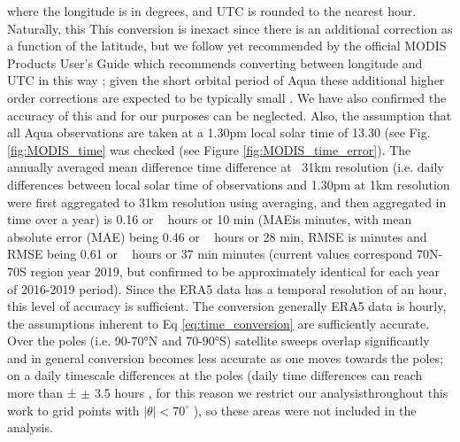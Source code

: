 \documentclass[hess, twostagejnl]{copernicus}
\providecommand{\DIFadd}[1]{{\protect\color{blue} \sf #1}} %
\providecommand{\DIFdel}[1]{{\protect\color{red} \scriptsize #1}} %
\providecommand{\DIFaddbegin}{} %
\providecommand{\DIFaddend}{} %
\providecommand{\DIFdelbegin}{} %
\providecommand{\DIFdelend}{} %
\begin{document}
where \DIFdelbegin \DIFdel{the }\DIFdelend \DIFaddbegin \DIFadd{longitude is in degrees, and }\DIFaddend UTC is rounded to the nearest hour. \DIFdelbegin \DIFdel{Naturally, this }\DIFdelend \DIFaddbegin \DIFadd{This }\DIFaddend conversion is inexact since there is an additional correction as a function of the latitude, \DIFdelbegin \DIFdel{but we follow }\DIFdelend \DIFaddbegin \DIFadd{yet recommended by }\DIFaddend the official MODIS Products User’s Guide \DIFdelbegin \DIFdel{\cite{MODISusersguide} which recommends converting between longitude and UTC in this way}\DIFdelend \DIFaddbegin \DIFadd{\citep{MODISusersguide}}\DIFaddend ; given the short orbital period of Aqua these \DIFaddbegin \DIFadd{additional }\DIFaddend higher order corrections are expected to be typically small \DIFdelbegin \DIFdel{. We have also confirmed the accuracy of this }\DIFdelend \DIFaddbegin \DIFadd{and for our purposes can be neglected. Also, the }\DIFaddend assumption that all Aqua observations are taken at \DIFdelbegin \DIFdel{a }\DIFdelend \DIFaddbegin \DIFadd{1.30pm }\DIFaddend local solar time \DIFdelbegin \DIFdel{of 13.30 (see Fig. \ref{fig:MODIS_time}}\DIFdelend \DIFaddbegin \DIFadd{was checked (see Figure \ref{fig:MODIS_time_error}}\DIFaddend ). The annually averaged mean \DIFdelbegin \DIFdel{difference }\DIFdelend \DIFaddbegin \DIFadd{time difference at ~31km resolution (i.e. daily differences between local solar time of observations and 1.30pm at 1km resolution were first aggregated to 31km resolution using averaging, and then aggregated in time over a year) }\DIFaddend is 0.16 \DIFdelbegin \DIFdel{or ~}\DIFdelend \DIFaddbegin \DIFadd{hours or }\DIFaddend 10 \DIFdelbegin \DIFdel{min (MAEis }\DIFdelend \DIFaddbegin \DIFadd{minutes, with mean absolute error (MAE) being }\DIFaddend 0.46 \DIFdelbegin \DIFdel{or ~}\DIFdelend \DIFaddbegin \DIFadd{hours or }\DIFaddend 28 \DIFdelbegin \DIFdel{min, RMSE is }\DIFdelend \DIFaddbegin \DIFadd{minutes and RMSE being }\DIFaddend 0.61 \DIFdelbegin \DIFdel{or ~}\DIFdelend \DIFaddbegin \DIFadd{hours or }\DIFaddend 37 \DIFdelbegin \DIFdel{min}\DIFdelend \DIFaddbegin \DIFadd{minutes (current values correspond 70N-70S region year 2019, but confirmed to be approximately identical for each year of 2016-2019 period}\DIFaddend ). Since the \DIFdelbegin \DIFdel{ERA5 data has a }\DIFdelend temporal resolution of \DIFdelbegin \DIFdel{an hour, this level of accuracy is sufficient. The conversion generally }\DIFdelend \DIFaddbegin \DIFadd{ERA5 data is hourly, the assumptions inherent to Eq \ref{eq:time_conversion} are sufficiently accurate. Over the poles (i.e. 90-70°N and 70-90°S) satellite sweeps overlap significantly and in general conversion }\DIFaddend becomes less accurate \DIFdelbegin \DIFdel{as one moves towards the poles; on a daily timescale differences at the poles }\DIFdelend \DIFaddbegin \DIFadd{(daily time differences }\DIFaddend can reach more than \DIFdelbegin \DIFdel{±}\DIFdelend \DIFaddbegin \DIFadd{$\pm$ }\DIFaddend 3.5 hours\DIFdelbegin \DIFdel{, for this reason we restrict our analysisthroughout this work to grid points with $|\theta| < 70^{\circ}$}\DIFdelend \DIFaddbegin \DIFadd{), so these areas were not included in the analysis}\DIFaddend . \newline 
\end{document}
